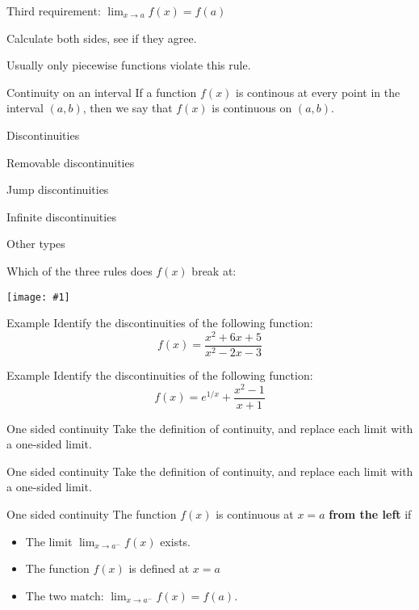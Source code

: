 \documentclass[t]{beamer}
\newenvironment{fpi}
  {\itemize[nolistsep,itemsep=\fill]}
  {\vfill\enditemize}
\newcommand{\img}[1]{
\vfill
\texttt{[image: \#1]}
\vfill
}
\begin{document}
\begin{frame}{Third requirement:  $\displaystyle \lim_{x \to a} f(x) = f(a)$}
\begin{fpi}
\item Calculate both sides, see if they agree.
\item Usually only piecewise functions violate this rule.
\end{fpi}
\end{frame}

\begin{frame}{Continuity on an interval}
If a function $f(x)$ is continous at every point in the interval $(a,b)$,
then we say that $f(x)$ is continuous on $(a,b)$.
\end{frame}

\begin{frame}{Discontinuities}
\begin{fpi}
\item Removable discontinuities
\item Jump discontinuities
\item Infinite discontinuities
\item Other types
\end{fpi}
\end{frame}

\begin{frame}{Which of the three rules does $f(x)$ break at:}
\img{discontinuous1}
\end{frame}

\begin{frame}{Example}
Identify the discontinuities of the following function:
$$f(x) = \frac{x^2 + 6x + 5}{x^2 - 2x -3}$$
\end{frame}

\begin{frame}{Example}
Identify the discontinuities of the following function:
$$f(x) = e^{1/x} + \frac{x^2 - 1}{x+1}$$
\end{frame}

\begin{frame}{One sided continuity}
Take the definition of continuity, and replace each limit with a one-sided
limit.
\end{frame}

\begin{frame}{One sided continuity}
Take the definition of continuity, and replace each limit with a one-sided
limit.
\end{frame}

\begin{frame}{One sided continuity}
The function $f(x)$ is continuous at $x = a$  \textbf{from the left} if 
\begin{itemize}
\item The limit $\displaystyle \lim_{x \to a^-} f(x)$ exists.
\item The function $f(x)$ is defined at $x = a$
\item The two match: $\displaystyle \lim_{x \to a^-} f(x) = f(a)$.
\end{itemize}
\end{frame}
\end{document}
